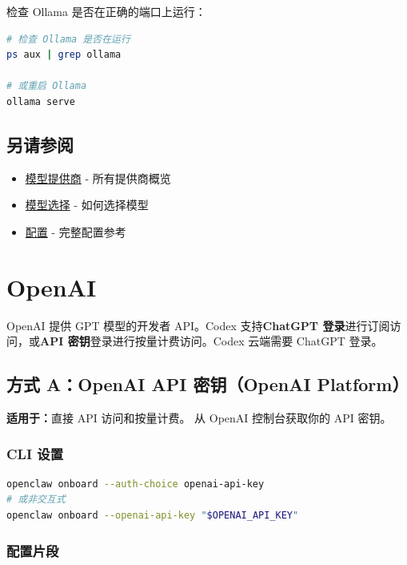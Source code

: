 检查 Ollama 是否在正确的端口上运行：

\begin{lstlisting}[language=bash]
# 检查 Ollama 是否在运行
ps aux | grep ollama

# 或重启 Ollama
ollama serve
\end{lstlisting}


\subsection{另请参阅}


\begin{itemize}
  \item \href{/concepts/model-providers}{模型提供商} - 所有提供商概览
  \item \href{/concepts/models}{模型选择} - 如何选择模型
  \item \href{/gateway/configuration}{配置} - 完整配置参考
\end{itemize}



\clearpage

\section{OpenAI}


OpenAI 提供 GPT 模型的开发者 API。Codex 支持\textbf{ChatGPT 登录}进行订阅访问，或\textbf{API 密钥}登录进行按量计费访问。Codex 云端需要 ChatGPT 登录。

\subsection{方式 A：OpenAI API 密钥（OpenAI Platform）}


\textbf{适用于：}直接 API 访问和按量计费。
从 OpenAI 控制台获取你的 API 密钥。

\subsubsection{CLI 设置}


\begin{lstlisting}[language=bash]
openclaw onboard --auth-choice openai-api-key
# 或非交互式
openclaw onboard --openai-api-key "$OPENAI_API_KEY"
\end{lstlisting}


\subsubsection{配置片段}


